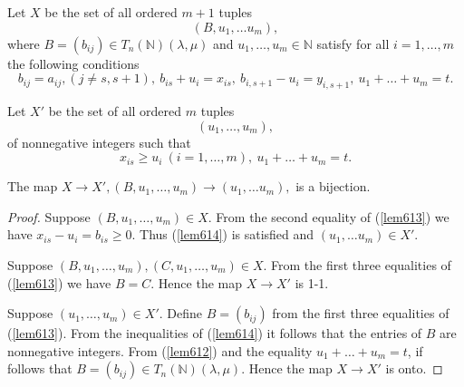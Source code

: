 \documentclass[ALCO,Unicode]{cedram}
\newcommand{\la}{\lambda}
\numberwithin{equation}{section}
\begin{document}
		Let $X$ be the set of all ordered $m+1$ tuples \[(B, u_1, \dots u_m),\] where $B=(b_{ij}) \in T_{n}(\mathbb{N})(\la, \mu)$ and  $u_1,\dots,u_m \in \mathbb{N}$ satisfy for all $i=1,\dots,m$ the following conditions
		\begin{equation}
			\label{lem613}b_{ij}=a_{ij}, (j\neq s, s+1), \  b_{is}+u_i=x_{is}, \  b_{i,s+1}-u_i=y_{i,s+1}, \  u_1+ \dots +u_m=t.
		\end{equation}
		
		Let $X'$ be the set of all ordered $m$ tuples \[(u_1, \dots, u_m),\] of nonnegative integers such that \begin{equation} \label{lem614} 
			x_{is} \ge u_i  \  (i=1, \dots, m), \  u_1 + \dots +u_m = t.
		\end{equation}
		\begin{lemma}\label{lemma1}
			The map $X \to X', (B,u_1,\dots,u_m) \to (u_1,\dots u_m),$ is a bijection.
		\end{lemma}
		\begin{proof}
			Suppose $(B,u_1,\dots,u_m) \in X$. From the second equality of (\ref{lem613}) we have $x_{is}-u_i=b_{is} \ge 0$. Thus (\ref{lem614}) is satisfied and $(u_1,\dots u_m) \in X'$.
			
			Suppose $(B,u_1,\dots,u_m),  (C,u_1,\dots,u_m)\in X$. From the first three equalities of (\ref{lem613}) we have $B=C$. Hence the map $X \to X'$ is 1-1.
			
			Suppose $(u_1,\dots,u_m) \in X'$. Define $B=(b_{ij})$ from the first three equalities of (\ref{lem613}). From the inequalities of (\ref{lem614}) it follows that the entries of $B$ are nonnegative integers. From (\ref{lem612}) and the equality $u_1+\dots+u_m=t$, if follows that $B=(b_{ij}) \in T_{n}(\mathbb{N})(\la, \mu)$. Hence the map $X \to X'$ is onto.
		\end{proof}
\end{document}
